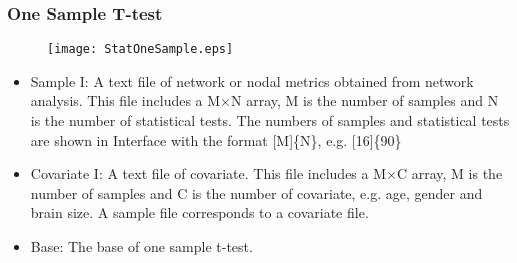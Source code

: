 \documentclass[11pt]{article}
\begin{document}
            \subsubsection{One Sample T-test}
				\begin{figure}
					\begin{center}
						\texttt{[image: StatOneSample.eps]}
					\end{center}
				\end{figure}
                \begin{itemize}
                    \item Sample I: A text file of network or nodal
                        metrics obtained from network analysis. This file
                        includes a M$\times$N array, M is the number of
                        samples and N is the number of statistical tests.
                        The numbers of samples and statistical tests are
                        shown in Interface with the format [M]\{N\}, 
                        e.g. [16]\{90\}
                    \item Covariate I: A text file of covariate. This file
                        includes a M$\times$C array, M is the number of 
                        samples and C is the number of covariate, e.g. 
                        age, gender and brain size. A sample file 
                        corresponds to a covariate file.
                    \item Base: The base of one sample t-test.
                \end{itemize}
\end{document}
